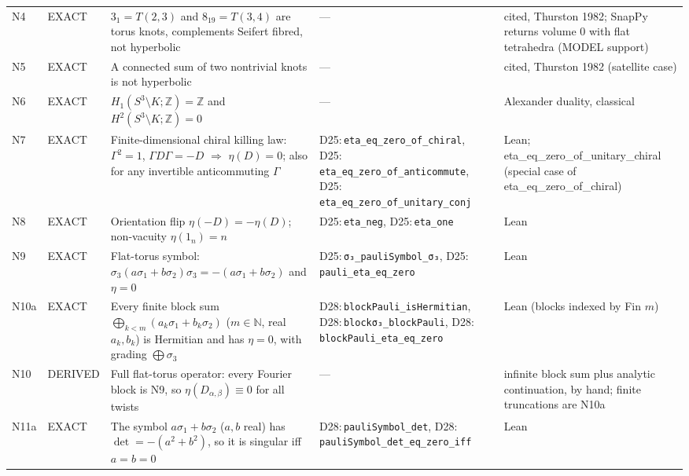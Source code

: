 \documentclass[11pt]{article}
\theoremstyle{definition}
\newcommand{\lean}[1]{\texttt{\small #1}}
\begin{document}
{\begin{longtable}{@{}L{0.05\textwidth}L{0.12\textwidth}L{0.26\textwidth}L{0.27\textwidth}L{0.17\textwidth}@{}}
N4 & EXACT & $3_1=T(2,3)$ and $8_{19}=T(3,4)$ are torus knots, complements Seifert fibred, not hyperbolic & --- & cited, Thurston 1982; SnapPy returns volume 0 with flat tetrahedra (MODEL support)\\
N5 & EXACT & A connected sum of two nontrivial knots is not hyperbolic & --- & cited, Thurston 1982 (satellite case)\\
N6 & EXACT & $H_1(S^3\setminus K;\mathbb Z)=\mathbb Z$ and $H^2(S^3\setminus K;\mathbb Z)=0$ & --- & Alexander duality, classical\\
N7 & EXACT & Finite-dimensional chiral killing law: $\Gamma^2=1$, $\Gamma D\Gamma=-D$ $\Rightarrow$ $\eta(D)=0$; also for any invertible anticommuting $\Gamma$ & D25:\,\lean{eta\_\allowbreak{}eq\_\allowbreak{}zero\_\allowbreak{}of\_\allowbreak{}chiral}, D25:\,\lean{eta\_\allowbreak{}eq\_\allowbreak{}zero\_\allowbreak{}of\_\allowbreak{}anticommute}, D25:\,\lean{eta\_\allowbreak{}eq\_\allowbreak{}zero\_\allowbreak{}of\_\allowbreak{}unitary\_\allowbreak{}conj} & Lean; eta\_\allowbreak{}eq\_\allowbreak{}zero\_\allowbreak{}of\_\allowbreak{}unitary\_\allowbreak{}chiral (special case of eta\_\allowbreak{}eq\_\allowbreak{}zero\_\allowbreak{}of\_\allowbreak{}chiral)\\
N8 & EXACT & Orientation flip $\eta(-D)=-\eta(D)$; non-vacuity $\eta(1_n)=n$ & D25:\,\lean{eta\_\allowbreak{}neg}, D25:\,\lean{eta\_\allowbreak{}one} & Lean\\
N9 & EXACT & Flat-torus symbol: $\sigma_3(a\sigma_1+b\sigma_2)\sigma_3=-(a\sigma_1+b\sigma_2)$ and $\eta=0$ & D25:\,\lean{σ₃\_\allowbreak{}pauliSymbol\_\allowbreak{}σ₃}, D25:\,\lean{pauli\_\allowbreak{}eta\_\allowbreak{}eq\_\allowbreak{}zero} & Lean\\
N10a & EXACT & Every finite block sum $\bigoplus_{k<m}(a_k\sigma_1+b_k\sigma_2)$ ($m\in\mathbb N$, real $a_k,b_k$) is Hermitian and has $\eta=0$, with grading $\bigoplus\sigma_3$ & D28:\,\lean{blockPauli\_\allowbreak{}isHermitian}, D28:\,\lean{blockσ₃\_\allowbreak{}blockPauli}, D28:\,\lean{blockPauli\_\allowbreak{}eta\_\allowbreak{}eq\_\allowbreak{}zero} & Lean (blocks indexed by Fin $m$)\\
N10 & DERIVED & Full flat-torus operator: every Fourier block is N9, so $\eta(D_{\alpha,\beta})\equiv0$ for all twists & --- & infinite block sum plus analytic continuation, by hand; finite truncations are N10a\\
N11a & EXACT & The symbol $a\sigma_1+b\sigma_2$ ($a,b$ real) has $\det=-(a^2+b^2)$, so it is singular iff $a=b=0$ & D28:\,\lean{pauliSymbol\_\allowbreak{}det}, D28:\,\lean{pauliSymbol\_\allowbreak{}det\_\allowbreak{}eq\_\allowbreak{}zero\_\allowbreak{}iff} & Lean\\

\end{longtable}}
\end{document}
